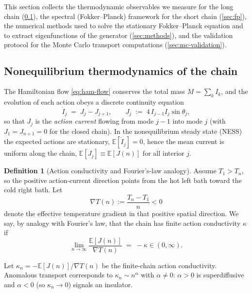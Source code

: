 \documentclass[11pt,a4paper]{article}
\theoremstyle{definition}
\newtheorem{definition}[theorem]{Definition}
\newcommand{\E}{\mathbb{E}}
\numberwithin{equation}{section}   %
\begin{document}
This section collects the thermodynamic observables we measure for the long
chain (\cref{sec:thermo}), the spectral (Fokker--Planck) framework for the
short chain (\cref{sec:fp}), the numerical methods used to solve the stationary
Fokker--Planck equation and to extract eigenfunctions of the generator
(\cref{sec:methods}), and the validation protocol for the Monte Carlo
transport computations (\cref{sec:mc-validation}).

\subsection{Nonequilibrium thermodynamics of the chain}\label{sec:thermo}

The Hamiltonian flow \eqref{eq:ham-flow} conserves the total mass
$M=\sum_k I_k$, and the evolution of each action obeys a discrete continuity
equation
\begin{equation}\label{eq:continuity}
  \dot I_j \;=\; J_j - J_{j+1},
  \qquad
  J_j \;:=\; 4\, I_{j-1} I_j \sin\theta_j ,
\end{equation}
so that $J_j$ is the \emph{action current} flowing from mode $j-1$ into mode
$j$ (with $J_1=J_{n+1}=0$ for the closed chain). In the nonequilibrium steady
state (NESS) the expected actions are stationary, $\E[\dot I_j]=0$, hence the
mean current is uniform along the chain, $\E[J_j]\equiv \E[J(n)]$ for all interior
$j$.

\begin{definition}[Action conductivity and Fourier's-law analogy]\label{de:fourier}
Assume $T_1>T_n$, so the positive action-current direction points from the hot
left bath toward the cold right bath. Let
\[
  \nabla T(n):=\frac{T_n-T_1}{n}<0
\]
denote the effective temperature gradient in that positive spatial direction.
We say, by analogy with Fourier's law, that the chain has finite action
conductivity $\kappa$ if
\begin{equation}\label{eq:fourier}
  \lim_{n \rightarrow \infty}\frac{\E[J(n)]}{\nabla T(n)} \;=\; -
  \kappa \in (0,\infty).
\end{equation}

Let $\kappa_n = -\E[J(n)]/\nabla T(n)$ be the finite-chain action
conductivity. Anomalous transport corresponds to $\kappa_n\sim n^{\alpha}$ with
$\alpha\neq0$:
$\alpha>0$ is superdiffusive and $\alpha<0$ (so $\kappa_n\to0$) signals an
insulator.
\end{definition}
\end{document}
